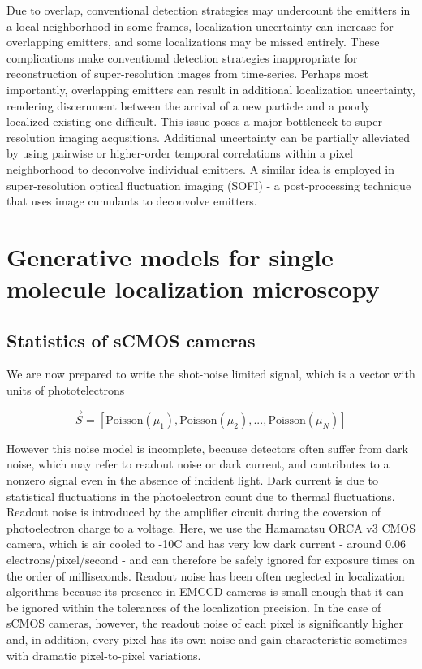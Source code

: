 \documentclass{ucetd}
\begin{document}
Due to overlap, conventional detection strategies may undercount the emitters in a local neighborhood in some frames, localization uncertainty can increase for overlapping emitters, and some localizations may be missed entirely. These complications make conventional detection strategies inappropriate for reconstruction of super-resolution images from time-series. Perhaps most importantly, overlapping emitters can result in additional localization uncertainty, rendering discernment between the arrival of a new particle and a poorly localized existing one difficult. This issue poses a major bottleneck to super-resolution imaging acqusitions. Additional uncertainty can be partially alleviated by using pairwise or higher-order temporal correlations within a pixel neighborhood to deconvolve individual emitters. A similar idea is employed in super-resolution optical fluctuation imaging (SOFI) - a post-processing technique that uses image cumulants to deconvolve emitters. 


\section{Generative models for single molecule localization microscopy}

\subsection{Statistics of sCMOS cameras}

We are now prepared to write the shot-noise limited signal, which is a vector with units of phototelectrons

\begin{equation}
\vec{S} = \left[\mathrm{Poisson}(\mu_{1}), \mathrm{Poisson}(\mu_{2}), ..., \mathrm{Poisson}(\mu_{N})\right]
\end{equation}


However this noise model is incomplete, because detectors often suffer from dark noise, which may refer to readout noise or dark current, and contributes to a nonzero signal even in the absence of incident light. Dark current is due to statistical fluctuations in the photoelectron count due to thermal fluctuations. Readout noise is introduced by the amplifier circuit during the coversion of photoelectron charge to a voltage. Here, we use the Hamamatsu ORCA v3 CMOS camera, which is air cooled to -10C and has very low dark current - around 0.06 electrons/pixel/second - and can therefore be safely ignored for exposure times on the order of milliseconds. Readout noise has been often neglected in localization algorithms because its presence in EMCCD cameras is small enough that it can be ignored within the tolerances of the localization precision. In the case of sCMOS cameras, however, the readout noise of each pixel is significantly higher and, in addition, every pixel has its own noise and gain characteristic sometimes with dramatic pixel-to-pixel variations.
\end{document}
